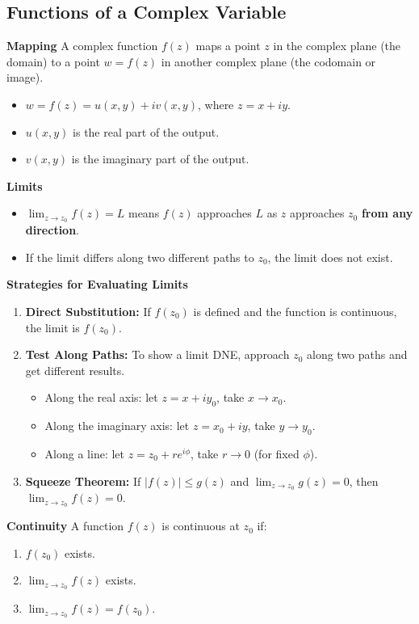 \documentclass{../cheatsheet}
\begin{document}
\begin{multicols}{3}
\section{Functions of a Complex Variable}

\textbf{Mapping}
A complex function $f(z)$ maps a point $z$ in the complex plane (the domain) to a point $w=f(z)$ in another complex plane (the codomain or image).
\begin{itemize}
    \item $w = f(z) = u(x,y) + iv(x,y)$, where $z=x+iy$.
    \item $u(x,y)$ is the real part of the output.
    \item $v(x,y)$ is the imaginary part of the output.
\end{itemize}

\textbf{Limits}
\begin{itemize}
    \item $\lim_{z \to z_0} f(z) = L$ means $f(z)$ approaches $L$ as $z$ approaches $z_0$ \textbf{from any direction}.
    \item If the limit differs along two different paths to $z_0$, the limit does not exist.
\end{itemize}
\textbf{Strategies for Evaluating Limits}
\begin{enumerate}
    \item \textbf{Direct Substitution:} If $f(z_0)$ is defined and the function is continuous, the limit is $f(z_0)$.
    \item \textbf{Test Along Paths:} To show a limit DNE, approach $z_0$ along two paths and get different results.
        \begin{itemize}
            \item Along the real axis: let $z = x + iy_0$, take $x \to x_0$.
            \item Along the imaginary axis: let $z = x_0 + iy$, take $y \to y_0$.
            \item Along a line: let $z = z_0 + re^{i\phi}$, take $r \to 0$ (for fixed $\phi$).
        \end{itemize}
    \item \textbf{Squeeze Theorem:} If $|f(z)| \le g(z)$ and $\lim_{z \to z_0} g(z) = 0$, then $\lim_{z \to z_0} f(z) = 0$.
\end{enumerate}

\textbf{Continuity}
A function $f(z)$ is continuous at $z_0$ if:
\begin{enumerate}
    \item $f(z_0)$ exists.
    \item $\lim_{z \to z_0} f(z)$ exists.
    \item $\lim_{z \to z_0} f(z) = f(z_0)$.
\end{enumerate}


\end{multicols}
\end{document}
